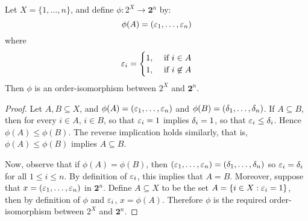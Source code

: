 \begin{proposition}\label{proposition_1.5.6}
  Let $X=\{1, \dots, n\}$, and define $\phi:2^X \xrightarrow{}
  \textbf{2}^n$ by:
  \begin{equation*}
    \phi(A)=(\varepsilon_1, \dots, \varepsilon_n)
  \end{equation*}
  where
  \begin{equation*}
    \varepsilon_i=
    \begin{cases}
      1, &  \text{ if } i \in A \\
      1, &  \text{ if } i \not\in A \\
    \end{cases}
  \end{equation*}
  Then $\phi$ is an order-isomorphism between $2^X$ and
  $\textbf{2}^n$.
\end{proposition}
\begin{proof}
  Let $A, B \subseteq X$, and $\phi(A)=(\varepsilon_1, \dots, \varepsilon_n)$ and
  $\phi(B)=(\delta_1, \dots, \delta_n)$. If $A \subseteq B$, then for every $i
  \in A$, $i \in B$, so that $\varepsilon_i=1$ implies  $\delta_i=1$, so that
  $\varepsilon_i \leq \delta_i$. Hence $\phi(A) \leq \phi(B)$. The reverse
  implication holds similarly, that is, $\phi(A) \leq \phi(B)$ implies
  $A \subseteq B$.

  Now, observe that if $\phi(A)=\phi(B)$, then $(\varepsilon_1, \dots,
  \varepsilon_n)=(\delta_1, \dots ,\delta_n)$ so $\varepsilon_i=\delta_i$ for  all $1 \leq i \leq
  n$. By definition of $\varepsilon_i$, this implies that $A=B$. Moreover,
  suppose that $x=(\varepsilon_1, \dots, \varepsilon_n)$ in $\textbf{2}^n$. Define $A
  \subseteq X$ to be the set $A=\{i \in X : \varepsilon_i=1\}$, then by
  definition of $\phi$ and $\varepsilon_i$, $x=\phi(A)$. Therefore $\phi$ is
  the required order-isomorphism between $2^X$ and $\textbf{2}^n$.
\end{proof}

